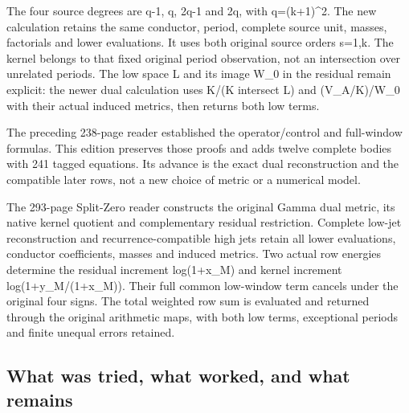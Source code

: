 \documentclass[
]{article}
\begin{document}
The four source degrees are q-1, q, 2q-1 and 2q, with q=(k+1)\^{}2. The
new calculation retains the same conductor, period, complete source
unit, masses, factorials and lower evaluations. It uses both original
source orders s=1,k. The kernel belongs to that fixed original period
observation, not an intersection over unrelated periods. The low space L
and its image W\_0 in the residual remain explicit: the newer dual
calculation uses K/(K intersect L) and (V\_A/K)/W\_0 with their actual
induced metrics, then returns both low terms.

The preceding 238-page reader established the operator/control and
full-window formulas. This edition preserves those proofs and adds
twelve complete bodies with 241 tagged equations. Its advance is the
exact dual reconstruction and the compatible later rows, not a new
choice of metric or a numerical model.

The 293-page Split-Zero reader constructs the original Gamma dual
metric, its native kernel quotient and complementary residual
restriction. Complete low-jet reconstruction and recurrence-compatible
high jets retain all lower evaluations, conductor coefficients, masses
and induced metrics. Two actual row energies determine the residual
increment log(1+x\_M) and kernel increment log(1+y\_M/(1+x\_M)). Their
full common low-window term cancels under the original four signs. The
total weighted row sum is evaluated and returned through the original
arithmetic maps, with both low terms, exceptional periods and finite
unequal errors retained.

\subsection{What was tried, what worked, and what
remains}\label{what-was-tried-what-worked-and-what-remains}
\end{document}
